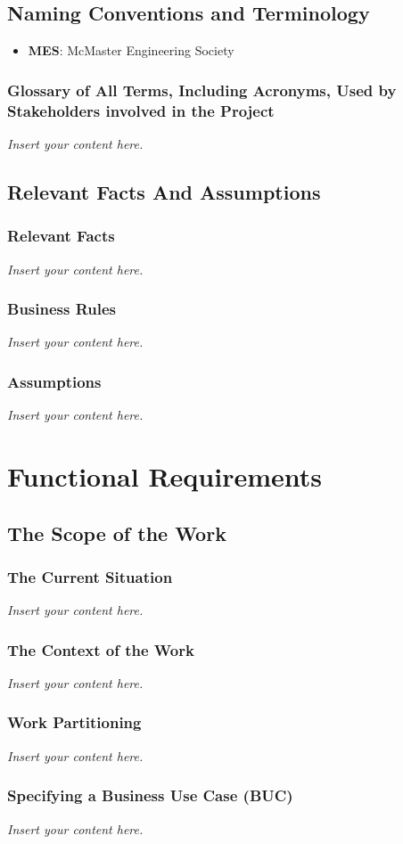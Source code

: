 \documentclass[12pt]{article}
\newcommand{\lips}{\textit{Insert your content here.}}
\begin{document}
\subsection{Naming Conventions and Terminology}
\begin{itemize}
  \item \textbf{MES}: McMaster Engineering Society
\end{itemize}
\subsubsection{Glossary of All Terms, Including Acronyms, Used by Stakeholders
involved in the Project}
\lips

\subsection{Relevant Facts And Assumptions}
\subsubsection{Relevant Facts}
\lips
\subsubsection{Business Rules}
\lips
\subsubsection{Assumptions}
\lips

\section{Functional Requirements}
\subsection{The Scope of the Work}
\subsubsection{The Current Situation}
\lips
\subsubsection{The Context of the Work}
\lips
\subsubsection{Work Partitioning}
\lips
\subsubsection{Specifying a Business Use Case (BUC)}
\lips
\end{document}
